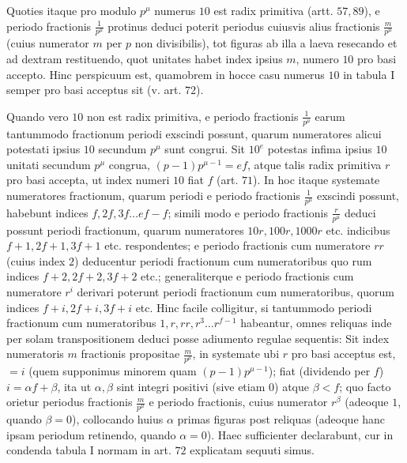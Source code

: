 Quoties itaque pro modulo \(p^\mu\) numerus \(10\) est radix primitiva (artt. \(57,89\)), e periodo fractionis \(\frac1{p^\mu}\) protinus deduci poterit periodus cuiusvis alius fractionis \(\frac m{p^\mu}\) (cuius numerator \(m\) per \(p\) non divisibilis), tot figuras ab illa a laeva resecando et ad dextram restituendo, quot unitates habet index ipsius \(m\), numero \(10\) pro basi accepto. Hinc perspicuum est, quamobrem in hocce casu numerus \(10\) in tabula I semper pro basi acceptus sit (v. art. \(72\)).

Quando vero \(10\) non est radix primitiva, e periodo fractionis \(\frac1{p^\mu}\) earum tantummodo fractionum periodi exscindi possunt, quarum numeratores alicui potestati ipsius \(10\) secundum \(p^\mu\) sunt congrui. Sit \(10^e\) potestas infima ipsius \(10\) unitati secundum \(p^\mu\) congrua, \((p-1)p^{\mu-1}=ef\), atque talis radix primitiva \(r\) pro basi accepta, ut index numeri \(10\) fiat \(f\) (art. \(71\)). In hoc itaque systemate numeratores fractionum, quarum periodi e periodo fractionis \(\frac1{p^\mu}\) exscindi possunt, habebunt indices \(f,2f,3f\ldots ef-f\); simili modo e periodo fractionis \(\frac r{p^\mu}\) deduci possunt periodi fractionum, quarum numeratores \(10r,100r,1000r\) etc. indicibus \(f+1,2f+1,3f+1\) etc. respondentes; e periodo fractionis cum numeratore \(rr\) (cuius index \(2\)) deducentur periodi fractionum cum numeratoribus quo%
rum indices \(f+2,2f+2,3f+2\) etc.; generaliterque e periodo fractionis cum numeratore \(r^i\) derivari poterunt periodi fractionum cum numeratoribus, quorum indices \(f+i,2f+i,3f+i\) etc. Hinc facile colligitur, si tantummodo periodi fractionum cum numeratoribus \(1,r,rr,r^3\ldots r^{f-1}\) habeantur, omnes reliquas inde per solam transpositionem deduci posse adiumento regulae sequentis: Sit index numeratoris \(m\) fractionis propositae \(\frac m{p^\mu}\), in systemate ubi \(r\) pro basi acceptus est, \(=i\) (quem supponimus minorem quam \((p-1)p^{\mu-1}\)); fiat (dividendo per \(f\)) \(i=\alpha f+\beta\), ita ut \(\alpha,\beta\) sint integri positivi (sive etiam \(0\)) atque \(\beta<f\); quo facto orietur periodus fractionis \(\frac m{p^\mu}\) e periodo fractionis, cuius numerator \(r^\beta\) (adeoque \(1\), quando \(\beta=0\)), collocando huius \(\alpha\) primas figuras post reliquas (adeoque hanc ipsam periodum retinendo, quando \(\alpha=0\)). Haec sufficienter declarabunt, cur in condenda tabula I normam in art. \(72\) explicatam sequuti simus.


